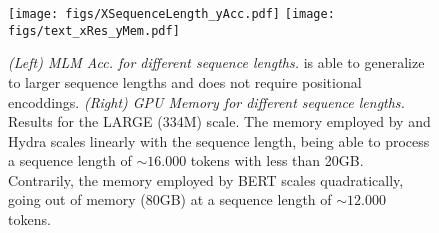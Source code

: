 \begin{table*}[t]
    \caption{\textit{C4 Masked Language Modelling and GLUE results for the LARGE scale ($334$M).} For each column (dataset), the best and the second best results are highlighted with \textbf{bold} and \underline{underline} respectively.}
    \centering
    \vspace{-2mm}

    \label{tab:MLM_full}

\end{table*}


\begin{figure}[t] 
    \centering
    \texttt{[image: figs/XSequenceLength\_yAcc.pdf]}
    \texttt{[image: figs/text\_xRes\_yMem.pdf]}
    \vspace{-1mm}
  \caption{%
  \textit{(Left) MLM Acc. for different sequence lengths.} \lions is able to generalize to larger sequence lengths and does not require positional encoddings. \textit{(Right) GPU Memory for different sequence lengths.} Results for the LARGE (334M) scale. The memory employed by \lion and Hydra scales linearly with the sequence length, being able to process a sequence length of $\sim 16.000$ tokens with less than 20GB. Contrarily, the memory employed by BERT scales quadratically, going out of memory ($80$GB) at a sequence length of $\sim 12.000$ tokens.
  }
  \label{fig:bert_memory}
\end{figure}

